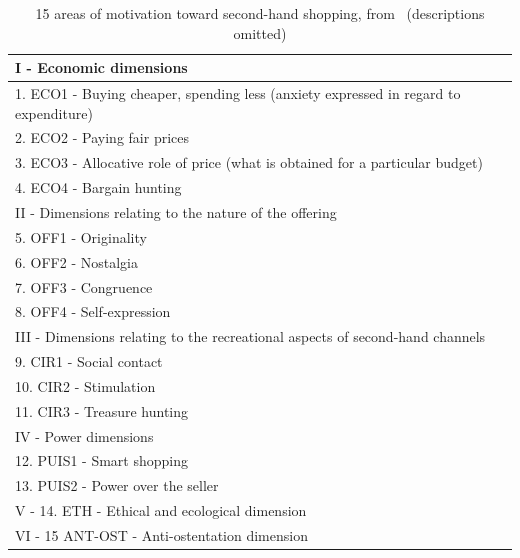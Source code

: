 \begin{table}[ht]
	\begin{tabular}{p{}}
		\toprule
		I - Economic dimensions                                                              \\\midrule
		1. ECO1 - Buying cheaper, spending less (anxiety expressed in regard to expenditure) \\
		2. ECO2 - Paying fair prices                                                         \\
		3. ECO3 - Allocative role of price (what is obtained for a particular budget)        \\
		4. ECO4 - Bargain hunting                                                            \\
		\toprule
		II - Dimensions relating to the nature of the offering                               \\\midrule
		5. OFF1 - Originality                                                                \\
		6. OFF2 - Nostalgia                                                                  \\
		7. OFF3 - Congruence                                                                 \\
		8. OFF4 - Self-expression                                                            \\
		\toprule
		III - Dimensions relating to the recreational aspects of second-hand channels        \\\midrule
		9. CIR1 - Social contact                                                             \\
		10. CIR2 - Stimulation                                                               \\
		11. CIR3 - Treasure hunting                                                          \\
		\toprule
		IV - Power dimensions                                                                \\\midrule
		12. PUIS1 - Smart shopping                                                           \\
		13. PUIS2 - Power over the seller                                                    \\
		\toprule
		V - 14. ETH - Ethical and ecological dimension                                       \\
		\toprule
		VI - 15 ANT-OST - Anti-ostentation dimension                                         \\
		\bottomrule
	\end{tabular}
	\caption{15 areas of motivation toward second-hand shopping, from~\cite{SecondHandMotives} (descriptions omitted)}\label{tab:SecondHandMotives}
\end{table}


